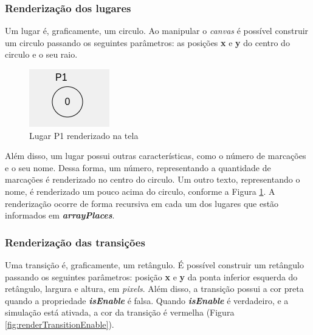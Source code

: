 \documentclass[
	12pt,				%
	openright,			%
	oneside,			%
	a4paper,			%
	english,			%
	brazil				%
	]{abntex2}
\theoremstyle{doispontos}
\begin{document}
\subsubsection{Renderização dos lugares}

Um lugar é, graficamente, um circulo. Ao manipular o \textit{canvas} é possível construir um circulo passando os seguintes parâmetros: as posições \textbf{x} e \textbf{y} do centro do circulo e o seu raio. 



\begin{figure}[ht] 
	\centering
	\includegraphics[scale=1]{figuras/renderPlace.png}
	\caption[Lugar P1 renderizado na tela]{Lugar P1 renderizado na tela}
	\label{fig:renderPlace}
\end{figure}
\FloatBarrier

Além disso, um lugar possui outras características, como o número de marcações e o seu nome. Dessa forma, um número, representando a quantidade de marcações é renderizado no centro do circulo. Um outro texto, representando o nome, é renderizado um pouco acima do circulo, conforme a Figura \ref{fig:renderPlace}. A renderização ocorre de forma recursiva em cada um dos lugares que estão informados em \textbf{\textit{arrayPlaces}}.

\subsubsection{Renderização das transições}

Uma transição é, graficamente, um retângulo. É possível construir um retângulo passando os seguintes parâmetros: posição \textbf{x} e \textbf{y} da ponta inferior esquerda do retângulo, largura e altura, em \textit{pixels}. Além disso, a transição possui a cor preta quando a propriedade \textbf{\textit{isEnable}} é falsa. Quando \textbf{\textit{isEnable}} é verdadeiro, e a simulação está ativada, a cor da transição é vermelha (Figura \ref{fig:renderTransitionEnable}). 


\end{document}
